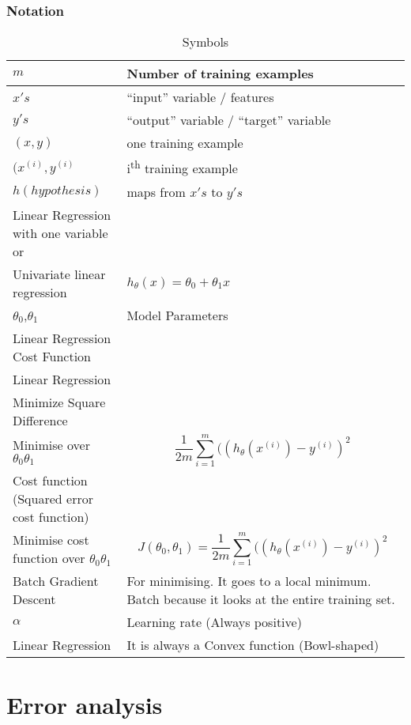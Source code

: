 \documentclass[a4paper]{report}
\begin{document}
\subsection{Notation}
\label{sec:notation}
\begin{table}[h!]
  \centering
  \begin{tabularx}{\textwidth}{l|X}
    $m$ & Number of training examples \\\hline
    $x's$ & ``input'' variable / features \\\hline
    $y's$ & ``output'' variable / ``target'' variable \\\hline
    $(x,y)$ & one training example \\\hline
    $(x^{(i)},y^{(i)}$ & i\textsuperscript{th} training example \\\hline
    $h(hypothesis)$ & maps from $x's$ to $y's$ \\\hline
    Linear Regression with one variable or \\ Univariate linear regression & $h_\theta(x)=\theta_0 + \theta_1x$ \\\hline
    $\theta_0$,$\theta_1$ & Model Parameters \\\hline
    Linear Regression Cost Function & \\\hline
    Linear Regression\\Minimize Square Difference\\Minimise over $\theta_0 \theta_1$ & $$\dfrac{1}{2m}\sum_{i=1}^m((h_\theta(x^({i}))-y^{(i)})^2$$\\\hline
    Cost function (Squared error cost function)\\ Minimise cost function over $\theta_0 \theta_1$ & $$J(\theta_0,\theta_1)=\dfrac{1}{2m}\sum_{i=1}^m((h_\theta(x^({i}))-y^{(i)})^2$$ \\\hline
   Batch Gradient Descent & For minimising. It goes to a local minimum. Batch because it looks at the entire training set. \\\hline
  $\alpha$ & Learning rate (Always positive)\\\hline
    Linear Regression & It is always a Convex function (Bowl-shaped) \\\hline
  \end{tabularx}
  \caption{Symbols}
  \label{tab:symbols}
\end{table}


\chapter{Error analysis}
\end{document}
